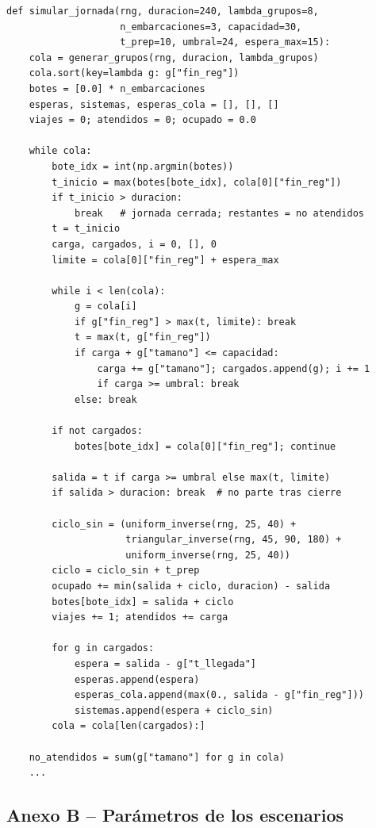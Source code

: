 \documentclass[12pt,a4paper]{article}
\begin{document}
\begin{lstlisting}[caption={Función \texttt{simular\_jornada}}]
def simular_jornada(rng, duracion=240, lambda_grupos=8,
                    n_embarcaciones=3, capacidad=30,
                    t_prep=10, umbral=24, espera_max=15):
    cola = generar_grupos(rng, duracion, lambda_grupos)
    cola.sort(key=lambda g: g["fin_reg"])
    botes = [0.0] * n_embarcaciones
    esperas, sistemas, esperas_cola = [], [], []
    viajes = 0; atendidos = 0; ocupado = 0.0

    while cola:
        bote_idx = int(np.argmin(botes))
        t_inicio = max(botes[bote_idx], cola[0]["fin_reg"])
        if t_inicio > duracion:
            break   # jornada cerrada; restantes = no atendidos
        t = t_inicio
        carga, cargados, i = 0, [], 0
        limite = cola[0]["fin_reg"] + espera_max

        while i < len(cola):
            g = cola[i]
            if g["fin_reg"] > max(t, limite): break
            t = max(t, g["fin_reg"])
            if carga + g["tamano"] <= capacidad:
                carga += g["tamano"]; cargados.append(g); i += 1
                if carga >= umbral: break
            else: break

        if not cargados:
            botes[bote_idx] = cola[0]["fin_reg"]; continue

        salida = t if carga >= umbral else max(t, limite)
        if salida > duracion: break  # no parte tras cierre

        ciclo_sin = (uniform_inverse(rng, 25, 40) +
                     triangular_inverse(rng, 45, 90, 180) +
                     uniform_inverse(rng, 25, 40))
        ciclo = ciclo_sin + t_prep
        ocupado += min(salida + ciclo, duracion) - salida
        botes[bote_idx] = salida + ciclo
        viajes += 1; atendidos += carga

        for g in cargados:
            espera = salida - g["t_llegada"]
            esperas.append(espera)
            esperas_cola.append(max(0., salida - g["fin_reg"]))
            sistemas.append(espera + ciclo_sin)
        cola = cola[len(cargados):]

    no_atendidos = sum(g["tamano"] for g in cola)
    ...
\end{lstlisting}

\subsection{Anexo B -- Parámetros de los escenarios}
\end{document}
